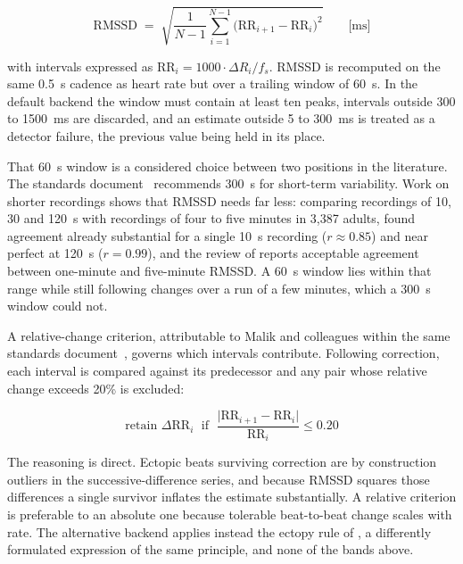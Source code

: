 \begin{equation}
\mathrm{RMSSD} \;=\; \sqrt{\frac{1}{N-1}
\sum_{i=1}^{N-1} \bigl( \mathrm{RR}_{i+1} - \mathrm{RR}_{i} \bigr)^{2}}
\qquad \text{[ms]}
\end{equation}

with intervals expressed as
$\mathrm{RR}_{i} = 1000 \cdot \Delta R_{i} / f_{s}$. RMSSD is
recomputed on the same 0.5~s cadence as heart rate but over a
trailing window of 60~s. In the default backend the window must
contain at least ten peaks, intervals outside 300 to 1500~ms are
discarded, and an estimate outside 5 to 300~ms is treated as a
detector failure, the previous value being held in its place.

That 60~s window is a considered choice between two positions in
the literature. The standards document~\citep{taskforce1996}
recommends 300~s for short-term variability. Work on shorter
recordings shows that RMSSD needs far less: comparing recordings
of 10, 30 and 120~s with recordings of four to five minutes in
3,387 adults, \citet{munoz2015} found agreement already
substantial for a single 10~s recording ($r \approx 0.85$) and
near perfect at 120~s ($r = 0.99$), and the review of
\citet{shaffer2017} reports acceptable agreement between
one-minute and five-minute RMSSD. A 60~s window lies within that
range while still following changes over a run of a few minutes,
which a 300~s window could not.

A relative-change criterion, attributable to Malik and colleagues
within the same standards document~\citep{taskforce1996},
governs which intervals contribute. Following correction, each
interval is compared against its predecessor and any pair whose
relative change exceeds 20\% is excluded:

\begin{equation}
\text{retain } \Delta \mathrm{RR}_{i}
\;\text{ if }\; \frac{\lvert \mathrm{RR}_{i+1} -
\mathrm{RR}_{i} \rvert}{\mathrm{RR}_{i}} \le 0.20
\end{equation}

The reasoning is direct. Ectopic beats surviving correction are
by construction outliers in the successive-difference series, and
because RMSSD squares those differences a single survivor inflates
the estimate substantially. A relative criterion is preferable to
an absolute one because tolerable beat-to-beat change scales with
rate. The alternative backend applies instead the ectopy rule of
\citet{lippman1994}, a differently formulated expression of the
same principle, and none of the bands above.

